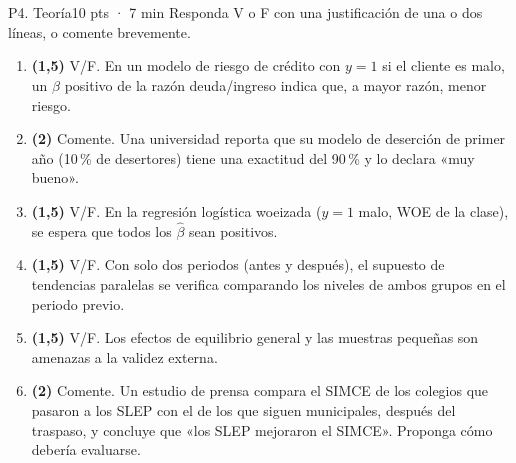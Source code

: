 \documentclass[11pt,a4paper]{article}
\begin{document}
\begin{preg}{P4. Teoría}{10 pts · 7 min}
\small Responda V o F con una justificación de una o dos líneas, o comente brevemente.
\begin{enumerate}[label=\arabic*.,leftmargin=*,itemsep=2pt]
\item \textbf{(1,5)} V/F. En un modelo de riesgo de crédito con $y=1$ si el cliente es malo, un $\hat\beta$ positivo de la razón deuda/ingreso indica que, a mayor razón, menor riesgo.
\item \textbf{(2)} Comente. Una universidad reporta que su modelo de deserción de primer año (10\,\% de desertores) tiene una exactitud del 90\,\% y lo declara «muy bueno».
\item \textbf{(1,5)} V/F. En la regresión logística woeizada ($y=1$ malo, WOE de la clase), se espera que todos los $\hat\beta$ sean positivos.
\item \textbf{(1,5)} V/F. Con solo dos periodos (antes y después), el supuesto de tendencias paralelas se verifica comparando los niveles de ambos grupos en el periodo previo.
\item \textbf{(1,5)} V/F. Los efectos de equilibrio general y las muestras pequeñas son amenazas a la validez externa.
\item \textbf{(2)} Comente. Un estudio de prensa compara el SIMCE de los colegios que pasaron a los SLEP con el de los que siguen municipales, después del traspaso, y concluye que «los SLEP mejoraron el SIMCE». Proponga cómo debería evaluarse.
\end{enumerate}
\end{preg}
\end{document}
